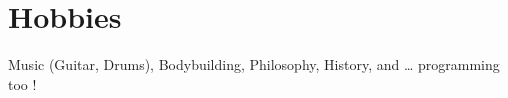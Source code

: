 \section{Hobbies}
    \resumeSubHeadingListStart
        \renewcommand{\labelitemi}{-}
        \setlength{\itemindent}{-15pt}
        \item{Music (Guitar, Drums), Bodybuilding, Philosophy, History, and … programming too !}
    \resumeSubHeadingListEnd